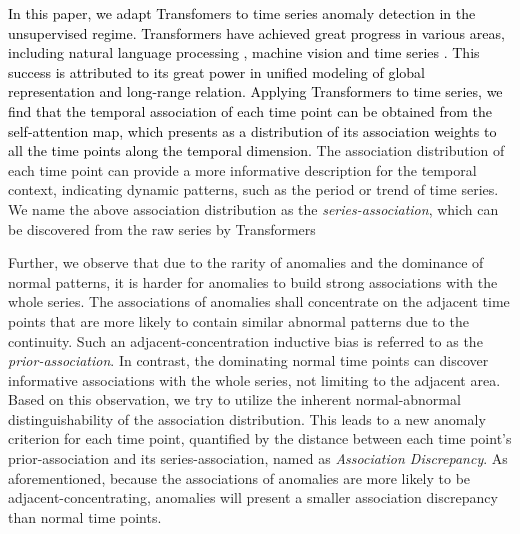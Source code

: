 \documentclass{article} %
\newcommand{\update}[1]{{\textcolor{black}{#1}}}
\begin{document}
\update{In this paper, we adapt Transfomers \citep{NIPS2017_3f5ee243} to time series anomaly detection in the unsupervised regime. Transformers have achieved great progress in various areas, including natural language processing \citep{NEURIPS2020_1457c0d6}, machine vision \citep{liu2021Swin} and time series \citep{haoyietal-informer-2021}. This success is attributed to its great power in unified modeling of global representation and long-range relation. Applying Transformers to time series, we find that the temporal association of each time point can be obtained from the self-attention map, which presents as a distribution of its association weights to all the time points along the temporal dimension.} The association distribution of each time point can provide a more informative description for the temporal context, indicating dynamic patterns, such as the period or trend of time series. We name the above association distribution as the \textit{series-association}, which can be discovered from the raw series by Transformers


Further, we observe that due to the rarity of anomalies and the dominance of normal patterns, it is harder for anomalies to build strong associations with the whole series. The associations of anomalies shall concentrate on the adjacent time points that are more likely to contain similar abnormal patterns due to the continuity. Such an adjacent-concentration inductive bias is referred to as the \textit{prior-association}. In contrast, the dominating normal time points can discover informative associations with the whole series, not limiting to the adjacent area. Based on this observation, we try to utilize the inherent normal-abnormal distinguishability of the association distribution. This leads to a new anomaly criterion for each time point, quantified by the distance between each time point’s prior-association and its series-association, named as \textit{Association Discrepancy}. As aforementioned, because the associations of anomalies are more likely to be adjacent-concentrating, anomalies will present a smaller association discrepancy than normal time points.
\end{document}
